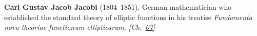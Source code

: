 \textbf{Carl Gustav Jacob Jacobi} (1804–1851). German mathematician who established the standard theory of elliptic functions in his treatise \emph{Fundamenta nova theoriae functionum ellipticarum}. \emph{[Ch.~\hyperref[ch:billiardsconicsporism]{07}]}

